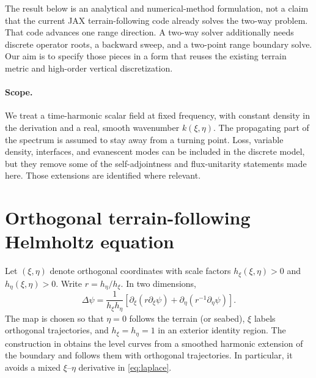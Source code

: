 \documentclass[11pt]{article}
\newcommand{\pd}{\partial}
\begin{document}
The result below is an analytical and numerical-method formulation, not a
claim that the current JAX terrain-following code already solves the two-way
problem. That code advances one range direction. A two-way solver additionally
needs discrete operator roots, a backward sweep, and a two-point range
boundary solve. Our aim is to specify those pieces in a form that reuses the
existing terrain metric and high-order vertical discretization.

\paragraph{Scope.} We treat a time-harmonic scalar field at fixed frequency,
with constant density in the derivation and a real, smooth wavenumber
$k(\xi,\eta)$. The propagating part of the spectrum is assumed to stay away
from a turning point. Loss, variable density, interfaces, and evanescent
modes can be included in the discrete model, but they remove some of the
self-adjointness and flux-unitarity statements made here. Those extensions
are identified where relevant.

\section{Orthogonal terrain-following Helmholtz equation}

Let $(\xi,\eta)$ denote orthogonal coordinates with scale factors
$h_\xi(\xi,\eta)>0$ and $h_\eta(\xi,\eta)>0$. Write
$r=h_\eta/h_\xi$. In two dimensions,
\begin{equation}\label{eq:laplace}
  \Delta\psi=\frac{1}{h_\xi h_\eta}
  \left[\pd_\xi(r\pd_\xi\psi)+\pd_\eta(r^{-1}\pd_\eta\psi)\right].
\end{equation}
The map is chosen so that $\eta=0$ follows the terrain (or seabed),
$\xi$ labels orthogonal trajectories, and $h_\xi=h_\eta=1$ in an exterior
identity region. The construction in \cite{lytaev_tf} obtains the level curves
from a smoothed harmonic extension of the boundary and follows them with
orthogonal trajectories. In particular, it avoids a mixed $\xi$--$\eta$
derivative in \eqref{eq:laplace}.
\end{document}
